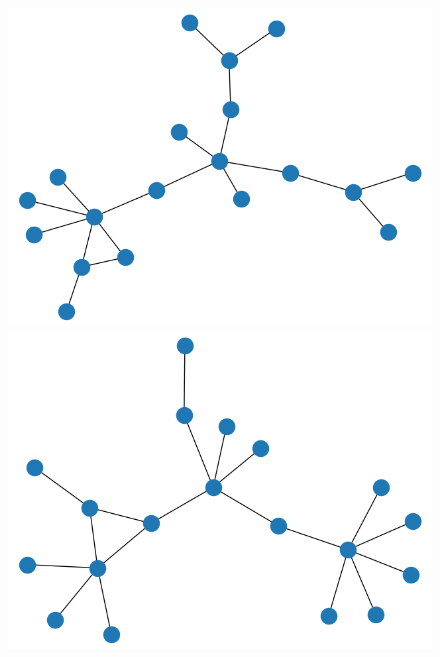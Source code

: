 \documentclass[11pt,english]{article}
\theoremstyle{plain}
\theoremstyle{remark}
\begin{document}
\begin{figure}[hbt]
    \includegraphics[scale=0.2]{timeline/state4.png}
    \includegraphics[scale=0.2]{timeline/state5.png}
    
    ~
    

\end{figure}
\end{document}
